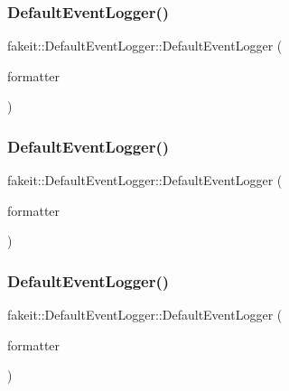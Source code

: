 \subsubsection{\texorpdfstring{DefaultEventLogger()}{DefaultEventLogger()}\hspace{0.1cm}{\footnotesize\ttfamily [1/9]}}
{\footnotesize\ttfamily fakeit\+::\+Default\+Event\+Logger\+::\+Default\+Event\+Logger (\begin{DoxyParamCaption}\item[{\mbox{\hyperlink{structfakeit_1_1EventFormatter}{Event\+Formatter}} \&}]{formatter }\end{DoxyParamCaption})\hspace{0.3cm}{\ttfamily [inline]}}

\mbox{\label{structfakeit_1_1DefaultEventLogger_a20fe9266e4a323b5fc282d797fe7ecfd}} 
\subsubsection{\texorpdfstring{DefaultEventLogger()}{DefaultEventLogger()}\hspace{0.1cm}{\footnotesize\ttfamily [2/9]}}
{\footnotesize\ttfamily fakeit\+::\+Default\+Event\+Logger\+::\+Default\+Event\+Logger (\begin{DoxyParamCaption}\item[{\mbox{\hyperlink{structfakeit_1_1EventFormatter}{Event\+Formatter}} \&}]{formatter }\end{DoxyParamCaption})\hspace{0.3cm}{\ttfamily [inline]}}

\mbox{\label{structfakeit_1_1DefaultEventLogger_a20fe9266e4a323b5fc282d797fe7ecfd}} 
\subsubsection{\texorpdfstring{DefaultEventLogger()}{DefaultEventLogger()}\hspace{0.1cm}{\footnotesize\ttfamily [3/9]}}
{\footnotesize\ttfamily fakeit\+::\+Default\+Event\+Logger\+::\+Default\+Event\+Logger (\begin{DoxyParamCaption}\item[{\mbox{\hyperlink{structfakeit_1_1EventFormatter}{Event\+Formatter}} \&}]{formatter }\end{DoxyParamCaption})\hspace{0.3cm}{\ttfamily [inline]}}


